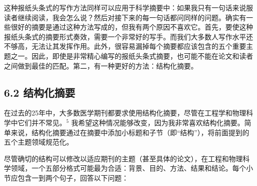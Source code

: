 这种报纸头条式的写作方法同样可以应用于科学摘要中：如果我只有一句话来说服读者继续阅读，我会怎么说？然后对接下来的每一句话都问同样的问题。确实有一些很好的摘要是通过这种方法写成的，但我有两个原因不喜欢它。首先，要使这种报纸头条式的摘要形式奏效，需要一个非常好的写手。而我们大多数人写作水平还不够高，无法让其发挥作用。此外，很容易漏掉每个摘要都应该包含的五个重要主题之一。因此，即使是非常精心编写的报纸头条式摘要，也可能不能在论文和读者之间做到最佳的匹配。第二，有一种更好的方法：结构化摘要。

\subsection*{6.2 结构化摘要}
在过去的25年中，大多数医学期刊都要求使用结构化摘要，尽管在工程学和物理科学中它们并不常见。${ }^{5}$ 我希望这种情况能够改变，因为我非常喜欢结构化摘要。简单来说，结构化摘要通过在摘要中添加小标题和子节（即“结构”），将前面提到的五个主题领域规范化。

尽管确切的结构可以修改以适应期刊的主题（甚至具体的论文），在工程和物理科学领域，一个五部分格式可能最为合适：背景、目的、方法、结果和结论。每个小节应包含一到两个句子，回答以下问题：

